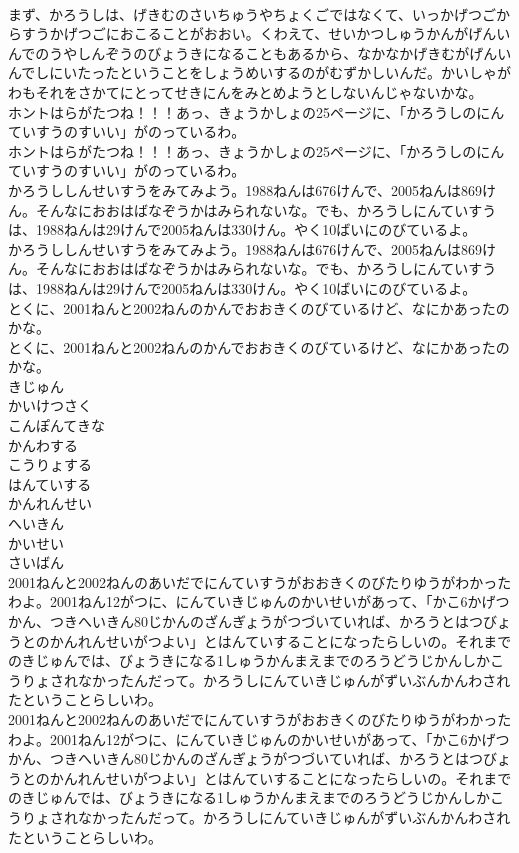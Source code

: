 \documentclass[8pt]{extreport}
\begin{document}
\begin{CJK}{UTF8}{min}
\\	まず、かろうしは、げきむのさいちゅうやちょくごではなくて、いっかげつごからすうかげつごにおこることがおおい。くわえて、せいかつしゅうかんがげんいんでのうやしんぞうのびょうきになることもあるから、なかなかげきむがげんいんでしにいたったということをしょうめいするのがむずかしいんだ。かいしゃがわもそれをさかてにとってせきにんをみとめようとしないんじゃないかな。
\\	ホントはらがたつね！！！あっ、きょうかしょの25ページに、「かろうしのにんていすうのすいい」がのっているわ。
\\	ホントはらがたつね！！！あっ、きょうかしょの25ページに、「かろうしのにんていすうのすいい」がのっているわ。
\\	かろうししんせいすうをみてみよう。1988ねんは676けんで、2005ねんは869けん。そんなにおおはばなぞうかはみられないな。でも、かろうしにんていすうは、1988ねんは29けんで2005ねんは330けん。やく10ばいにのびているよ。
\\	かろうししんせいすうをみてみよう。1988ねんは676けんで、2005ねんは869けん。そんなにおおはばなぞうかはみられないな。でも、かろうしにんていすうは、1988ねんは29けんで2005ねんは330けん。やく10ばいにのびているよ。
\\	とくに、2001ねんと2002ねんのかんでおおきくのびているけど、なにかあったのかな。
\\	とくに、2001ねんと2002ねんのかんでおおきくのびているけど、なにかあったのかな。
\\	きじゅん
\\	かいけつさく
\\	こんぽんてきな
\\	かんわする
\\	こうりょする
\\	はんていする
\\	かんれんせい
\\	へいきん
\\	かいせい
\\	さいばん
\\	2001ねんと2002ねんのあいだでにんていすうがおおきくのびたりゆうがわかったわよ。2001ねん12がつに、にんていきじゅんのかいせいがあって、「かこ6かげつかん、つきへいきん80じかんのざんぎょうがつづいていれば、かろうとはつびょうとのかんれんせいがつよい」とはんていすることになったらしいの。それまでのきじゅんでは、びょうきになる1しゅうかんまえまでのろうどうじかんしかこうりょされなかったんだって。かろうしにんていきじゅんがずいぶんかんわされたということらしいわ。
\\	2001ねんと2002ねんのあいだでにんていすうがおおきくのびたりゆうがわかったわよ。2001ねん12がつに、にんていきじゅんのかいせいがあって、「かこ6かげつかん、つきへいきん80じかんのざんぎょうがつづいていれば、かろうとはつびょうとのかんれんせいがつよい」とはんていすることになったらしいの。それまでのきじゅんでは、びょうきになる1しゅうかんまえまでのろうどうじかんしかこうりょされなかったんだって。かろうしにんていきじゅんがずいぶんかんわされたということらしいわ。

\end{CJK}
\end{document}
